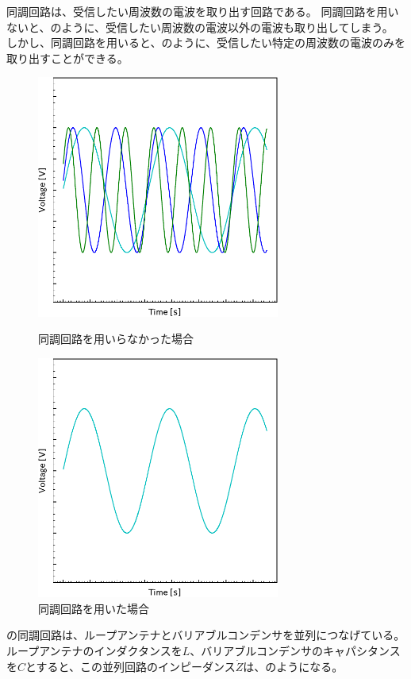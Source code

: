 \documentclass[report.tex]{subfiles}
\begin{document}
同調回路は、受信したい周波数の電波を取り出す回路である。
同調回路を用いないと、のように、受信したい周波数の電波以外の電波も取り出してしまう。
しかし、同調回路を用いると、のように、受信したい特定の周波数の電波のみを取り出すことができる。

\begin{figure}[H]
	\begin{minipage}[b]{0.5\linewidth}
		\centering
		\includegraphics[width=8cm]{fig/diff.pdf}
		\caption{同調回路を用いらなかった場合}
		\label{fig:notuse}
	\end{minipage}
	\begin{minipage}[b]{0.5\linewidth}
		\centering
		\includegraphics[width=8cm]{fig/diff2.pdf}
		\caption{同調回路を用いた場合}
		\label{fig:use}
	\end{minipage}
\end{figure}

の同調回路は、ループアンテナとバリアブルコンデンサを並列につなげている。
ループアンテナのインダクタンスを\(L\)、バリアブルコンデンサのキャパシタンスを\(C\)とすると、この並列回路のインピーダンス\(\dot{Z}\)は、のようになる。
\end{document}
